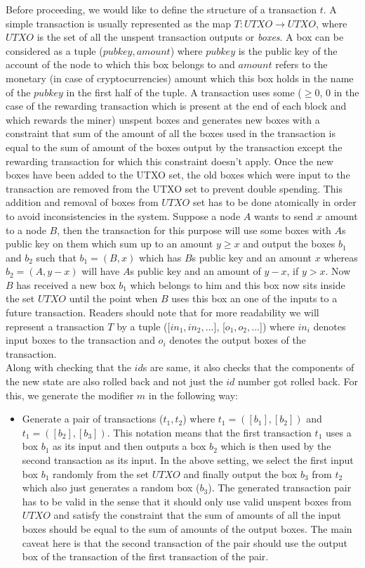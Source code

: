 \begin{enumerate}[\IEEEsetlabelwidth{Z}]
\begin{itemize}[]
Before proceeding, we would like to define the structure of a transaction $t$. A simple transaction is usually represented as the map $T : UTXO \to UTXO$, where $UTXO$ is the set of all the unspent transaction outputs or \textit{boxes}. A box can be considered as a tuple ($pubkey, amount$) where $pubkey$ is the public key of the account of the node to which this box belongs to and $amount$ refers to the monetary (in case of cryptocurrencies) amount which this box holds in the name of the $pubkey$ in the first half of the tuple. A transaction uses some ($\geq 0$, 0 in the case of the rewarding transaction which is present at the end of each block and which rewards the miner) unspent boxes and generates new boxes with a constraint that sum of the amount of all the boxes used in the transaction is equal to the sum of amount of the boxes output by the transaction except the rewarding transaction for which this constraint doesn't apply. Once the new boxes have been added to the UTXO set, the old boxes which were input to the transaction are removed from the UTXO set to prevent double spending. This addition and removal of boxes from $UTXO$ set has to be done atomically in order to avoid inconsistencies in the system. Suppose a node $A$ wants to send $x$ amount to a node $B$, then the transaction for this purpose will use some boxes with $A$s public key on them which sum up to an amount $y \geq x$ and output the boxes $b_1$ and $b_2$ such that $b_1 = (B, x)$ which has $B$s public key and an amount $x$ whereas $b_2 = (A, y-x)$ will have $A$s public key and an amount of $y-x$, if $y>x$. Now $B$ has received a new box $b_1$ which belongs to him and this box now sits inside the set $UTXO$ until the point when $B$ uses this box an one of the inputs to a future transaction. Readers should note that for more readability we will represent a transaction $T$ by a tuple ([$in_1, in_2, ...$], [$o_1, o_2, ...$]) where $in_i$ denotes input boxes to the transaction and $o_i$ denotes the output boxes of the transaction.\\
Along with checking that the $id$s are same, it also checks that the components of the new state are also rolled back and not just the $id$ number got rolled back. For this, we generate the modifier $m$ in the following way:
\begin{itemize}
\item Generate a pair of transactions ($t_1, t_2$) where $t_1 = ([b_{1}], [b_{2}])$ and $t_1 = ([b_{2}], [b_{3}])$. This notation means that the first transaction $t_1$ uses a box $b_1$ as its input and then outputs a box $b_2$ which is then used by the second transaction as its input. In the above setting, we select the first input box $b_1$ randomly from the set $UTXO$ and finally output the box $b_3$ from $t_2$ which also just generates a random box ($b_3$). The generated transaction pair has to be valid in the sense that it should only use valid unspent boxes from $UTXO$ and satisfy the constraint that the sum of amounts of all the input boxes should be equal to the sum of amounts of the output boxes. The main caveat here is that the second transaction of the pair should use the output box of the transaction of the first transaction of the pair.

\end{itemize}
\end{itemize}
\end{enumerate}

